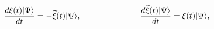 \begin{equation}
\label{dynamicalequations}
\frac{d\xi(t)|\Psi \rangle}{dt} = -{\widetilde \xi}(t)|\Psi \rangle,
\hspace{1.0in}
\frac{d{\widetilde \xi}(t)|\Psi \rangle}{dt} = \xi(t)|\Psi \rangle,
\end{equation}

